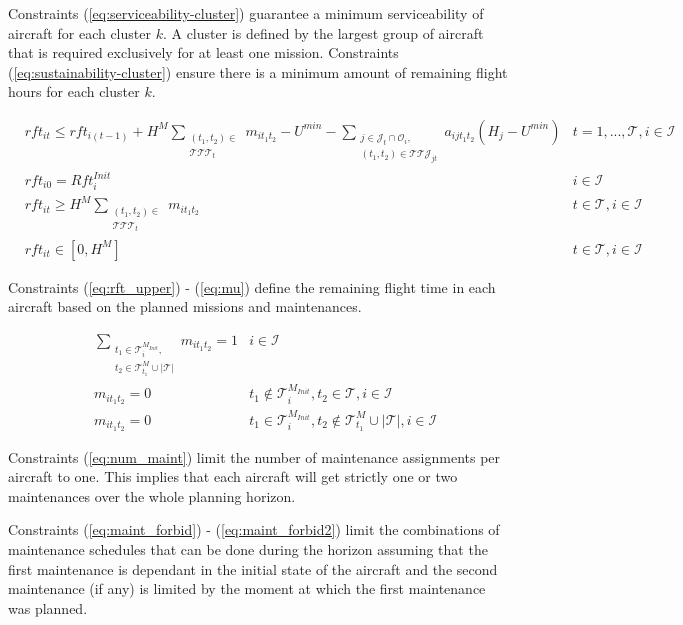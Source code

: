 \documentclass[a4paper,onecolumn,fleqn]{article}
\begin{document}
    Constraints (\ref{eq:serviceability-cluster}) guarantee a minimum serviceability of aircraft for each cluster $k$. A cluster is defined by the largest group of aircraft that is required exclusively for at least one mission. 
    Constraints (\ref{eq:sustainability-cluster}) ensure there is a minimum amount of remaining flight hours for each cluster $k$.

    \begin{align}
         & rft_{it} \leq rft_{i(t-1)} + H^M \sum_{\substack{(t_1, t_2) \in \\ \mathcal{T}\mathcal{T}\mathcal{T}_{t}}} m_{it_1t_2} - U^{min} - \sum_{\substack{j \in \mathcal{J}_t \cap \mathcal{O}_i, \\ (t_1, t_2) \in \mathcal{T}\mathcal{T}\mathcal{J}_{jt}}} a_{ijt_1t_2} (H_j - U^{min})
            & t =1, ..., \mathcal{T}, i \in \mathcal{I} \label{eq:rft_upper}\\
        & rft_{i0} = Rft^{Init}_i
               & i \in \mathcal{I} \label{eq:rft_initial}\\
        & rft_{it} \geq H^M \sum_{\substack{(t_1, t_2) \in \\ \mathcal{T}\mathcal{T}\mathcal{T}_{t}}} m_{it_1t_2}
                & t \in \mathcal{T}, i \in \mathcal{I}\label{eq:rft_lower}\\ 
        & rft_{it} \in [0,H^M]
                & t \in \mathcal{T}, i \in \mathcal{I} \label{eq:mu}
    \end{align}

    Constraints (\ref{eq:rft_upper}) - (\ref{eq:mu}) define the remaining flight time in each aircraft based on the planned missions and maintenances.

    \begin{align}
        & \sum_{\substack{t_1 \in \mathcal{T}^{M_{Init}}_i, \\ t_2 \in \mathcal{T}^M_{t_1} \cup |\mathcal{T}|}} m_{it_1t_2} =  1 
          & i \in \mathcal{I}\label{eq:num_maint} \\
        & m_{it_1t_2} =  0
          & t_1 \notin \mathcal{T}^{M_{Init}}_i, t_2 \in \mathcal{T}, i \in \mathcal{I} \label{eq:maint_forbid} \\
        & m_{it_1t_2} =  0
          & t_1 \in \mathcal{T}^{M_{Init}}_i, t_2 \notin \mathcal{T}^M_{t_1} \cup |\mathcal{T}|, i \in \mathcal{I} \label{eq:maint_forbid2}
    \end{align}

    Constraints (\ref{eq:num_maint}) limit the number of maintenance assignments per aircraft to one. This implies that each aircraft will get strictly one or two maintenances over the whole planning horizon.

    Constraints (\ref{eq:maint_forbid}) - (\ref{eq:maint_forbid2}) limit the combinations of maintenance schedules that can be done during the horizon assuming that the first maintenance is dependant in the initial state of the aircraft and the second maintenance (if any) is limited by the moment at which the first maintenance was planned.
\end{document}
